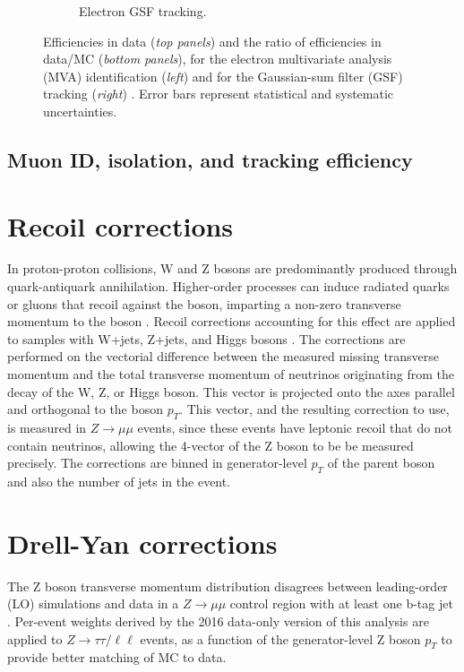 \begin{figure}[h]
\begin{subfigure}{0.45\textwidth}
        \caption{Electron GSF tracking.}
        \label{fig:electron_GSF_tracking_efficiency}
    \end{subfigure}
    \caption[Efficiencies in data (\textit{top panels}) and the ratio of efficiencies in data/MC (\textit{bottom panels}), for the electron multivariate analysis (MVA) identification (\textit{left}) and for the Gaussian-sum filter (GSF) tracking (\textit{right}).]{Efficiencies in data (\textit{top panels}) and the ratio of efficiencies in data/MC (\textit{bottom panels}), for the electron multivariate analysis (MVA) identification (\textit{left}) and for the Gaussian-sum filter (GSF) tracking (\textit{right}) \cite{CMS-DP-2020-037}. Error bars represent statistical and systematic uncertainties.} 
\end{figure}

\subsection{Muon ID, isolation, and tracking efficiency}



\section{Recoil corrections}
\label{sec:ch-8-recoil-corrections}
In proton-proton collisions, W and Z bosons are predominantly produced through quark-antiquark annihilation. Higher-order processes can induce radiated quarks or gluons that recoil against the boson, imparting a non-zero transverse momentum to the boson \cite{2009-Tevatron-recoil-correction}. Recoil corrections accounting for this effect are applied to samples with W+jets, Z+jets, and Higgs bosons \cite{twiki_HiggsToTauTauWorkingLegacyRun2}. The corrections are performed on the vectorial difference between the measured missing transverse momentum and the total transverse momentum of neutrinos originating from the decay of the W, Z, or Higgs boson. This vector is projected onto the axes parallel and orthogonal to the boson $p_{T}$. This vector, and the resulting correction to use, is measured in $Z \rightarrow \mu\mu$ events, since these events have leptonic recoil that do not contain neutrinos, allowing the 4-vector of the Z boson to be be measured precisely. The corrections are binned in generator-level $p_{T}$ of the parent boson and also the number of jets in the event.

\section{Drell-Yan corrections}
The Z boson transverse momentum distribution disagrees between leading-order (LO) simulations and data in a $Z \rightarrow \mu\mu$ control region with at least one b-tag jet \cite{CMS-HIG-17-024}. Per-event weights derived by the 2016 data-only version of this analysis \cite{CMS-HIG-17-024} are applied to $Z \rightarrow \tau\tau / \ell \ell$ events, as a function of the generator-level Z boson $p_{T}$ to provide better matching of MC to data.

